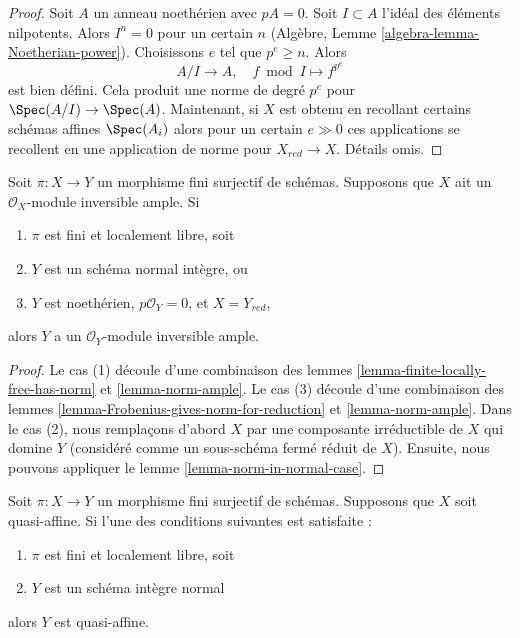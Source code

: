 \begin{proof}
Soit  $A$  un anneau noethérien avec  $pA = 0$. Soit  $I \subset A$ 
l'idéal des éléments nilpotents. Alors  $I^n = 0$  pour un certain  $n$ 
(Algèbre, Lemme  \ref{algebra-lemma-Noetherian-power}). Choisissons  $e$  tel que  $p^e \geq n$. Alors
$$
A/I \longrightarrow A,\quad
f \bmod I \longmapsto f^{p^e}
$$
est bien défini. Cela produit une norme de degré  $p^e$  pour  $\Spec(A/I) \to \Spec(A)$.
Maintenant, si  $X$  est obtenu en recollant certains schémas affines
 $\Spec(A_i)$  alors pour un certain  $e \gg 0$  ces applications se recollent en
une application de norme pour  $X_{red} \to X$. Détails omis.
\end{proof}

\begin{proposition}
\label{proposition-push-down-ample}
Soit  $\pi : X \to Y$  un morphisme fini surjectif de schémas. Supposons que
 $X$  ait un  $\mathcal{O}_X$-module inversible ample. Si
\begin{enumerate}
\item $\pi$  est fini et localement libre, soit
\item $Y$  est un schéma normal intègre, ou
\item $Y$  est noethérien,  $p\mathcal{O}_Y = 0$, et  $X = Y_{red}$,
\end{enumerate}
alors  $Y$  a un  $\mathcal{O}_Y$-module inversible ample.
\end{proposition}

\begin{proof}
Le cas (1) découle d'une combinaison des lemmes  \ref{lemma-finite-locally-free-has-norm}  et  \ref{lemma-norm-ample}. Le
cas (3) découle d'une combinaison des lemmes  \ref{lemma-Frobenius-gives-norm-for-reduction}  et  \ref{lemma-norm-ample}. Dans le
cas (2), nous remplaçons d'abord  $X$  par une composante irréductible de
 $X$  qui domine  $Y$  (considéré comme un sous-schéma fermé réduit
de  $X$). Ensuite, nous pouvons appliquer le lemme  \ref{lemma-norm-in-normal-case}.
\end{proof}

\begin{lemma}
\label{lemma-push-down-quasi-affine}
Soit  $\pi : X \to Y$  un morphisme fini surjectif de schémas. Supposons que
 $X$  soit quasi-affine. Si l'une des conditions suivantes est satisfaite :
\begin{enumerate}
\item $\pi$  est fini et localement libre, soit
\item $Y$  est un schéma intègre normal
\end{enumerate}
alors  $Y$  est quasi-affine.
\end{lemma}

